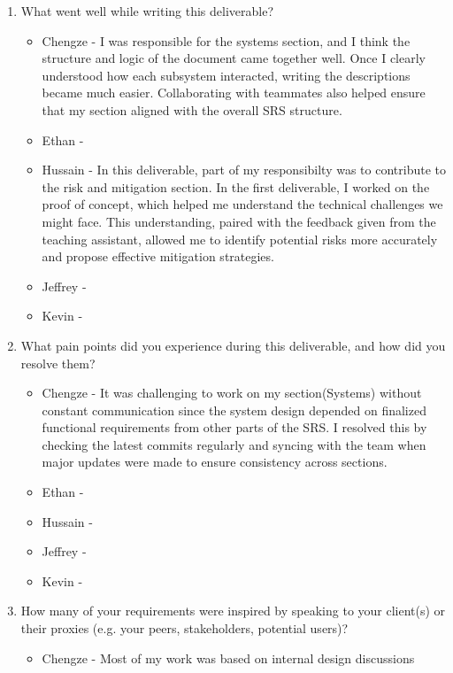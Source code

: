 \begin{enumerate}
  \item What went well while writing this deliverable?
  \begin{itemize}
        \item Chengze - I was responsible for the systems section, and 
        I think the structure and logic of the document came together 
        well. Once I clearly understood how each subsystem interacted, 
        writing the descriptions became much easier. Collaborating with 
        teammates also helped ensure that my section aligned with the 
        overall SRS structure.
        \item Ethan - 
        \item Hussain - In this deliverable, part of my responsibilty was to contribute to the risk and mitigation section. In the first deliverable, I worked on the proof of concept, which helped me understand the technical challenges we might face. This understanding, paired with the feedback given from the teaching assistant, allowed me to identify potential risks more accurately and propose effective mitigation strategies. 
        \item Jeffrey - 
        \item Kevin - 
  \end{itemize} 
  \item What pain points did you experience during this deliverable, and how did
  you resolve them?
  \begin{itemize}
        \item Chengze - It was challenging to work on my section(Systems) without 
        constant communication since the system design depended on finalized 
        functional requirements from other parts of the SRS. I resolved this 
        by checking the latest commits regularly and syncing with the team when 
        major updates were made to ensure consistency across sections.
        \item Ethan - 
        \item Hussain - 
        \item Jeffrey - 
        \item Kevin - 
  \end{itemize} 
  \item How many of your requirements were inspired by speaking to your
  client(s) or their proxies (e.g. your peers, stakeholders, potential users)?
  \begin{itemize}
        \item Chengze - Most of my work was based on internal design discussions 

\end{itemize}
\end{enumerate}
